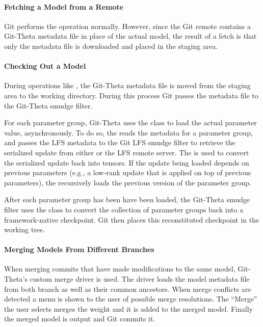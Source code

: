 \paragraph{Fetching a Model from a Remote}
Git performs the  operation normally. However, since the Git remote contains a Git-Theta metadata file in place of the actual model, the result of a fetch is that only the metadata file is downloaded and placed in the staging area.

\paragraph{Checking Out a Model}
During operations like , the Git-Theta metadata file is moved from the staging area to the working directory. During this process Git passes the metadata file to the Git-Theta smudge filter. 

For each parameter group, Git-Theta uses the  class to load the actual parameter value, asynchronously. To do so, the  reads the metadata for a parameter group, and passes the LFS metadata to the Git LFS smudge filter to retrieve the serialized update from either   or the LFS remote server.  The  is used to convert the serialized update back into tensors. If the update being loaded depends on previous parameters (e.g., a low-rank update that is applied on top of previous parameters), the  recursively loads the previous version of the parameter group.

After each parameter group has been  have been loaded, the Git-Theta smudge filter uses the  class to convert the collection of parameter groups back into a framework-native checkpoint. Git then places this reconstituted checkpoint in the working tree.

\paragraph{Merging Models From Different Branches}
When merging commits that have made modifications to the same model, Git-Theta's custom merge driver is used. The driver loads the model metadata file from both branch as well as their common ancestors. When merge conflicts are detected a menu is shown to the user of possible merge resolutions. The ``Merge'' the user selects merges the weight and it is added to the merged model. Finally the merged model is output and Git commits it.

